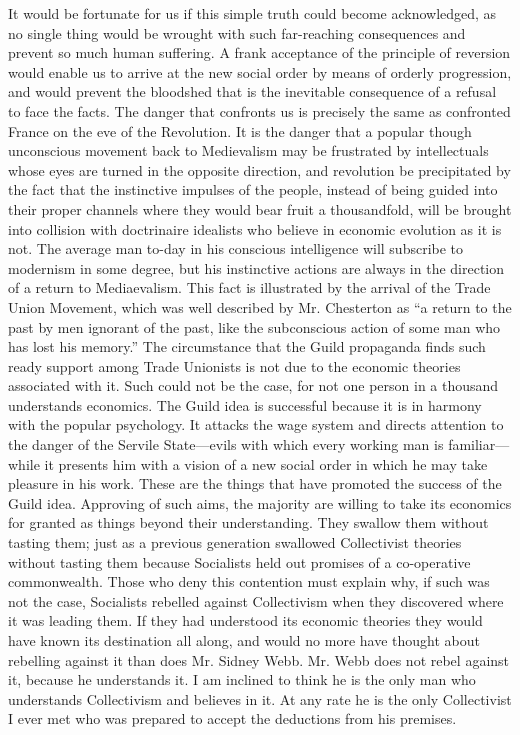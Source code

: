 \documentclass{book}
\begin{document}
It would be fortunate for us if this simple truth could become acknowledged, as no single thing would be wrought with such far-reaching consequences and prevent so much human suffering. A frank acceptance of the principle of reversion would enable us to arrive at the new social order by means of orderly progression, and would prevent the bloodshed that is the inevitable consequence of a refusal to face the facts. The danger that confronts us is precisely the same as confronted France on the eve of the Revolution. It is the danger that a popular though unconscious movement back to Medievalism may be frustrated by intellectuals whose eyes are turned in the opposite direction, and revolution be precipitated by the fact that the instinctive impulses of the people, instead of being guided into their proper channels where they would bear fruit a thousandfold, will be brought into collision with doctrinaire idealists who believe in economic evolution as it is not. The average man to-day in his conscious intelligence will subscribe to modernism in some degree, but his instinctive actions are always in the direction of a return to Mediaevalism. This fact is illustrated by the arrival of the Trade Union Movement, which was well described by Mr. Chesterton as “a return to the past by men ignorant of the past, like the subconscious action of some man who has lost his memory.” The circumstance that the Guild propaganda finds such ready support among Trade Unionists is not due to the economic theories associated with it. Such could not be the case, for not one person in a thousand understands economics. The Guild idea is successful because it is in harmony with the popular psychology. It attacks the wage system and directs attention to the danger of the Servile State—evils with which every working man is familiar—while it presents him with a vision of a new social order in which he may take pleasure in his work. These are the things that have promoted the success of the Guild idea. Approving of such aims, the majority are willing to take its economics for granted as things beyond their understanding. They swallow them without tasting them; just as a previous generation swallowed Collectivist theories without tasting them because Socialists held out promises of a co-operative commonwealth. Those who deny this contention must explain why, if such was not the case, Socialists rebelled against Collectivism when they discovered where it was leading them. If they had understood its economic theories they would have known its destination all along, and would no more have thought about rebelling against it than does Mr. Sidney Webb. Mr. Webb does not rebel against it, because he understands it. I am inclined to think he is the only man who understands Collectivism and believes in it. At any rate he is the only Collectivist I ever met who was prepared to accept the deductions from his premises.
\end{document}
